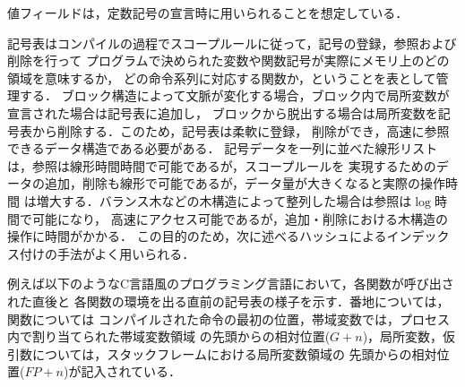 \documentclass[a4j,dvipdfmx]{jbook}
\begin{document}
値フィールドは，定数記号の宣言時に用いられることを想定している．

記号表はコンパイルの過程でスコープルールに従って，記号の登録，参照および削除を行って
プログラムで決められた変数や関数記号が実際にメモリ上のどの領域を意味するか，
どの命令系列に対応する関数か，ということを表として管理する．
ブロック構造によって文脈が変化する場合，ブロック内で局所変数が宣言された場合は記号表に追加し，
ブロックから脱出する場合は局所変数を記号表から削除する．このため，記号表は柔軟に登録，
削除ができ，高速に参照できるデータ構造である必要がある．
記号データを一列に並べた線形リストは，参照は線形時間時間で可能であるが，スコープルールを
実現するためのデータの追加，削除も線形で可能であるが，データ量が大きくなると実際の操作時間
は増大する．バランス木などの木構造によって整列した場合は参照は$\log$時間で可能になり，
高速にアクセス可能であるが，追加・削除における木構造の操作に時間がかかる．
この目的のため，次に述べるハッシュによるインデックス付けの手法がよく用いられる．

例えば以下のようなC言語風のプログラミング言語において，各関数が呼び出された直後と
各関数の環境を出る直前の記号表の様子を示す．番地については，関数については
コンパイルされた命令の最初の位置，帯域変数では，プロセス内で割り当てられた帯域変数領域
の先頭からの相対位置($G+n$)，局所変数，仮引数については，スタックフレームにおける局所変数領域の
先頭からの相対位置($FP+n$)が記入されている．

\end{document}
